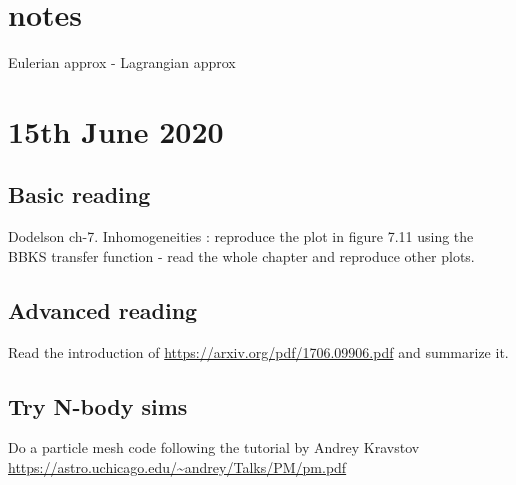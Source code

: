 \documentclass[12pt]{article}
\begin{document}
	
\section*{notes}

Eulerian approx - Lagrangian approx




\section*{15th June 2020}

\subsection*{Basic reading}
Dodelson ch-7. Inhomogeneities : reproduce the plot in figure 7.11 using the BBKS transfer function - read the whole chapter and reproduce other plots.

\subsection*{Advanced reading}
Read the introduction of \url{https://arxiv.org/pdf/1706.09906.pdf} and summarize it.

\subsection*{Try N-body sims}
Do a particle mesh code following the tutorial by Andrey Kravstov \url{https://astro.uchicago.edu/~andrey/Talks/PM/pm.pdf} 
\end{document}
